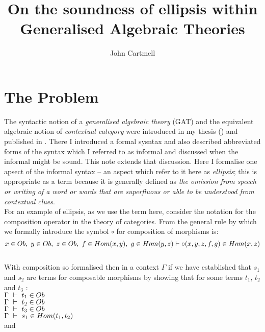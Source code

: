 \documentclass[10pt,a4paper,fleqn]{article}
\title{On the soundness of ellipsis within Generalised Algebraic Theories}
\author{John Cartmell}
\begin{document}
\maketitle


\section{The Problem}

The syntactic notion of a \textit{generalised algebraic theory} (GAT) and the  equivalent algebraic notion of \textit{contextual category} were introduced in my thesis (\cite{Cartmell78}) and published in \cite{Cartmell86}. 
There I introduced a formal sysntax and also described abbreviated forms of the syntax which I referred to as informal and discussed when the informal might be sound. This note extends that discussion. Here I formalise one apsect of the informal syntax -- an aspect which refer to it here as \textit{ellipsis}; this is appropriate as a term because it is generally defined as  \textit{the omission from speech or writing of a word or words that are superfluous or able to be understood from contextual clues}. \\

\noindent 
For an example of ellipsis, as we use the term here, consider the notation for the composition operator in the theory of categories. From \cite{Cartmell86} the general rule by which we formally introduce the symbol $\circ$ for composition of morphisms is:\\
$$\ofT{x}{Ob},\ \ofT{y}{Ob},\ \ofT{z}{Ob},\ \ofT{f}{Hom(x,y)},\ \ofT{g}{Hom(y,z)} \tstyle \ofT{\circ(x, y, z, f,g)}{Hom(x,z)}\label{composition intro}$$ \\
\noindent
With composition so formalised then in a context $\Gamma$ if we have established that $s_1$ and $s_2$ are 
terms for composable morphisms by showing that for some terms $t_1$, $t_2$ and $t_3$ : \\

$\Gamma\ \vdash\ t_1 \in Ob $ \\

$\Gamma\ \vdash\ t_2 \in Ob $ \\

$\Gamma\ \vdash\ t_3 \in Ob $ \\

$\Gamma\ \tstyle\ \ofT{s_1}{Hom(t_1,t_2)}$ \\

\noindent
and \\
\end{document}
